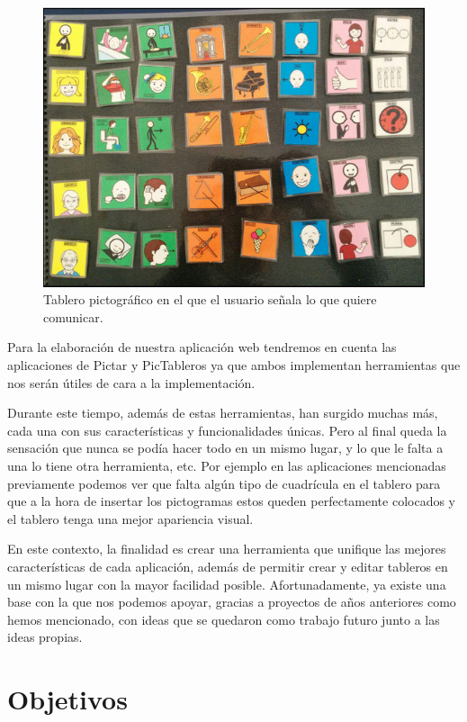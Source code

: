 \begin{figure}[h!]
	\centering
	\includegraphics[width=0.7\linewidth]{Imagenes/Bitmap/tablerofisico}
	\caption{Tablero pictográfico en el que el usuario señala lo que quiere comunicar.}
	\label{fig:tablerofisico}
\end{figure}


Para la elaboración de nuestra aplicación web tendremos en cuenta las aplicaciones de Pictar y PicTableros ya que ambos implementan herramientas que nos serán útiles de cara a la implementación. 

Durante este tiempo, además de estas herramientas, han surgido muchas más, cada una con sus características y funcionalidades únicas. Pero al final queda la sensación que nunca se podía hacer todo en un mismo lugar, y lo que le falta a una lo tiene otra herramienta, etc. Por ejemplo en las aplicaciones mencionadas previamente podemos ver que falta algún tipo de cuadrícula en el tablero para que a la hora de insertar los pictogramas estos queden perfectamente colocados y el tablero tenga una mejor apariencia visual.

En este contexto, la finalidad es crear una herramienta que unifique las mejores características de cada aplicación, además de permitir crear y editar tableros en un mismo lugar con la mayor facilidad posible. Afortunadamente, ya existe una base con la que nos podemos apoyar, gracias a proyectos de años anteriores como hemos mencionado, con ideas que se quedaron como trabajo futuro junto a las ideas propias. 








\section{Objetivos}
\label{cap1:sec:Objetivos}

